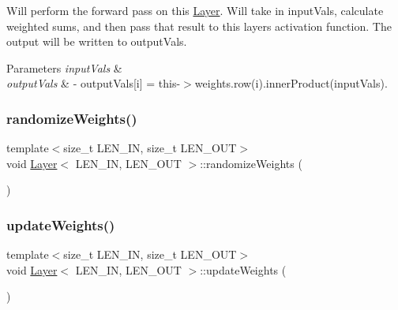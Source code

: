 Will perform the forward pass on this \hyperlink{class_layer}{Layer}. Will take in {\ttfamily input\+Vals}, calculate weighted sums, and then pass that result to this layer\textquotesingle{}s activation function. The output will be written to {\ttfamily output\+Vals}. 
\begin{DoxyParams}{Parameters}
{\em input\+Vals} & \\
\hline
{\em output\+Vals} & -\/ output\+Vals\mbox{[}i\mbox{]} = this-\/$>$weights.\+row(i).inner\+Product(input\+Vals). \\
\hline
\end{DoxyParams}
\mbox{\label{class_layer_aee349ae2e2c54fa8079cc564e84cb938}} 
\subsubsection{\texorpdfstring{randomize\+Weights()}{randomizeWeights()}}
{\footnotesize\ttfamily template$<$size\+\_\+t L\+E\+N\+\_\+\+IN, size\+\_\+t L\+E\+N\+\_\+\+O\+UT$>$ \\
void \hyperlink{class_layer}{Layer}$<$ L\+E\+N\+\_\+\+IN, L\+E\+N\+\_\+\+O\+UT $>$\+::randomize\+Weights (\begin{DoxyParamCaption}{ }\end{DoxyParamCaption})\hspace{0.3cm}{\ttfamily [inline]}}

\mbox{\label{class_layer_aa490ca327cae4e71d017d444c2c87468}} 
\subsubsection{\texorpdfstring{update\+Weights()}{updateWeights()}}
{\footnotesize\ttfamily template$<$size\+\_\+t L\+E\+N\+\_\+\+IN, size\+\_\+t L\+E\+N\+\_\+\+O\+UT$>$ \\
void \hyperlink{class_layer}{Layer}$<$ L\+E\+N\+\_\+\+IN, L\+E\+N\+\_\+\+O\+UT $>$\+::update\+Weights (\begin{DoxyParamCaption}{ }\end{DoxyParamCaption})\hspace{0.3cm}{\ttfamily [inline]}}



